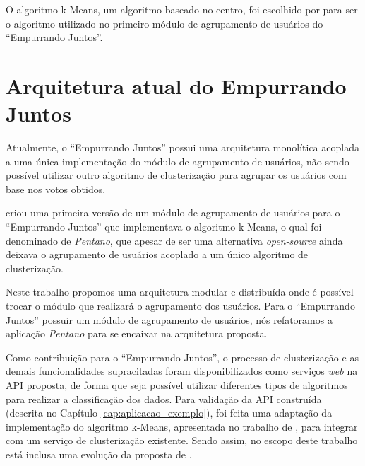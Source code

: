   O algoritmo k-Means, um algoritmo baseado no centro, foi escolhido por  
  para ser o algoritmo utilizado no primeiro módulo de agrupamento de usuários do ``Empurrando Juntos''.
  
\section{Arquitetura atual do Empurrando Juntos}
  
  Atualmente, o ``Empurrando Juntos'' possui uma arquitetura monolítica acoplada a uma única implementação
  do módulo de agrupamento de usuários, não sendo possível utilizar outro algoritmo de clusterização para
  agrupar os usuários com base nos votos obtidos.
  
   criou uma primeira versão de um módulo de agrupamento de usuários
  para o ``Empurrando Juntos'' que implementava o algoritmo k-Means,
  o qual foi denominado de \textit{Pentano}, que apesar de ser uma alternativa \textit{open-source}
  ainda deixava o agrupamento de usuários acoplado a um único algoritmo de clusterização. 
  
  Neste trabalho propomos uma arquitetura modular e distribuída onde é possível
  trocar o módulo que realizará o agrupamento dos usuários.
  Para o ``Empurrando Juntos'' possuir um módulo de agrupamento de usuários, 
  nós refatoramos a aplicação \textit{Pentano} para se encaixar na arquitetura proposta.
  
  Como contribuição para o ``Empurrando Juntos'', o processo de clusterização e as
  demais funcionalidades supracitadas foram disponibilizados como serviços
  \textit{web} na API proposta, de forma que seja possível utilizar diferentes tipos de algoritmos para realizar a classificação dos dados.
  Para validação da API construída (descrita no Capítulo \ref{cap:aplicacao_exemplo}), foi feita uma adaptação
  da implementação do algoritmo k-Means, apresentada no trabalho de ,
  para integrar com um serviço de clusterização existente. Sendo assim, no escopo deste trabalho está inclusa uma evolução da proposta
  de .

